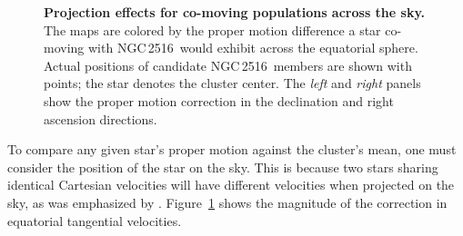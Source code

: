 \documentclass[12pt,twocolumn,tighten]{aastex63}
\newcommand{\cn}{NGC\,2516} %
\begin{document}
\begin{figure}[t]
	\begin{center}
		\leavevmode
	\end{center}
	\vspace{-0.5cm}
  \caption{ {\bf Projection effects for co-moving populations across
  the sky.} The maps are colored by the proper motion difference a star
  co-moving with \cn\ would exhibit across the equatorial sphere.
  Actual positions of candidate \cn\ members are shown with points;
  the star denotes the cluster center.
  The {\it left} and {\it right} panels show the proper motion correction in
  the declination and right ascension directions.
	\label{fig:vproj}
	}
\end{figure}

To compare any given star's proper motion against the cluster's mean,
one must consider the position of the star on the sky.  This is
because two stars sharing identical Cartesian velocities will have
different velocities when projected on the sky, as was emphasized by
\citet{meingast_2021}.
Figure~\ref{fig:vproj} shows the magnitude of the correction in
equatorial tangential velocities.


% 
% 
\end{document}
